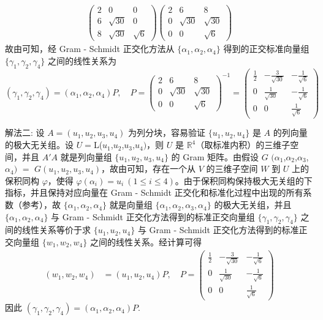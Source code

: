 \documentclass[../../main.tex]{subfiles}%
\begin{document}
\begin{solution}
\begin{align*}
\begin{pmatrix}
2 & 0 & 0 \\
6 & \sqrt{30} & 0 \\
8 & \sqrt{30} & \sqrt{6}
\end{pmatrix}
\begin{pmatrix}
2 & 6 & 8 \\
0 & \sqrt{30} & \sqrt{30} \\
0 & 0 & \sqrt{6}
\end{pmatrix}
\end{align*}
故由可知，经 Gram - Schmidt 正交化方法从 \(\{\alpha_1,\alpha_2,\alpha_4\}\) 得到的正交标准向量组 \(\{\gamma_1,\gamma_2,\gamma_4\}\) 之间的线性关系为
\[
(\gamma_1,\gamma_2,\gamma_4)=(\alpha_1,\alpha_2,\alpha_4)P,\quad 
P = 
\begin{pmatrix}
2 & 6 & 8 \\
0 & \sqrt{30} & \sqrt{30} \\
0 & 0 & \sqrt{6}
\end{pmatrix}^{-1}
=
\begin{pmatrix}
\frac{1}{2} & -\frac{3}{\sqrt{30}} & -\frac{1}{\sqrt{6}} \\
0 & \frac{1}{\sqrt{30}} & -\frac{1}{\sqrt{6}} \\
0 & 0 & \frac{1}{\sqrt{6}}
\end{pmatrix}
\]

{\color{blue}解法二:}
设 \(A = (u_1,u_2,u_3,u_4)\) 为列分块，容易验证 \(\{u_1,u_2,u_4\}\) 是 \(A\) 的列向量的极大无关组。设 $U = $L($u_1$,$u_2$,$u_3$,$u_4)$，则 \(U\) 是 \(\mathbb{R}^4\)（取标准内积）的三维子空间，并且 \(A'A\) 就是列向量组 \(\{u_1,u_2,u_3,u_4\}\) 的 Gram 矩阵。由假设 $G$ $(\alpha_1$,$\alpha_2$,$\alpha_3$,$\alpha_4)$ $=$ $G(u_1,u_2,u_3,u_4)$，故由可知，存在一个从 \(V\) 的三维子空间 \(W\) 到 \(U\) 上的保积同构 \(\varphi\)，使得 \(\varphi(\alpha_i) = u_i\ (1\leqslant  i \leqslant  4)\)。由于保积同构保持极大无关组的下指标，并且保持对应向量在 Gram - Schmidt 正交化和标准化过程中出现的所有系数（参考），故 \(\{\alpha_1,\alpha_2,\alpha_4\}\) 就是向量组 \(\{\alpha_1,\alpha_2,\alpha_3,\alpha_4\}\) 的极大无关组，并且 \(\{\alpha_1,\alpha_2,\alpha_4\}\) 与 Gram - Schmidt 正交化方法得到的标准正交向量组 \(\{\gamma_1,\gamma_2,\gamma_4\}\) 之间的线性关系等价于求 \(\{u_1,u_2,u_4\}\) 与 Gram - Schmidt 正交化方法得到的标准正交向量组 \(\{w_1,w_2,w_4\}\) 之间的线性关系。经计算可得
\begin{align*}
(w_1,w_2,w_4) &= (u_1,u_2,u_4)P,\quad P = 
\begin{pmatrix}
\frac{1}{2} & -\frac{3}{\sqrt{30}} & -\frac{1}{\sqrt{6}} \\
0 & \frac{1}{\sqrt{30}} & -\frac{1}{\sqrt{6}} \\
0 & 0 & \frac{1}{\sqrt{6}}
\end{pmatrix}
\end{align*}
因此 \((\gamma_1,\gamma_2,\gamma_4) = (\alpha_1,\alpha_2,\alpha_4)P\).

\end{solution}
\end{document}
